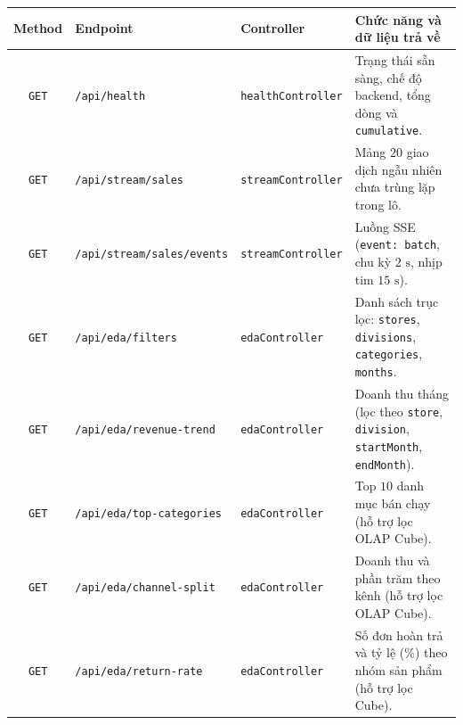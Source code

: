 \begin{table}[H]
	\centering
	\footnotesize
	\setlength{\tabcolsep}{3.5pt}
	\begin{tabular}{c l l p{5.5cm}}
		\toprule
		\textbf{Method} & \textbf{Endpoint}                        & \textbf{Controller}          & \textbf{Chức năng và dữ liệu trả về}                                                                \\
		\midrule
		\texttt{GET}    & \texttt{/api/health}                     & \texttt{healthController}    & Trạng thái sẵn sàng, chế độ backend, tổng dòng và \texttt{cumulative}.                              \\
		\texttt{GET}    & \texttt{/api/stream/sales}               & \texttt{streamController}    & Mảng $20$ giao dịch ngẫu nhiên chưa trùng lặp trong lô.                                             \\
		\texttt{GET}    & \texttt{/api/stream/sales/events}        & \texttt{streamController}    & Luồng SSE (\texttt{event: batch}, chu kỳ $2\text{ s}$, nhịp tim $15\text{ s}$).                     \\
		\texttt{GET}    & \texttt{/api/eda/filters}                & \texttt{edaController}       & Danh sách trục lọc: \texttt{stores}, \texttt{divisions}, \texttt{categories}, \texttt{months}.      \\
		\texttt{GET}    & \texttt{/api/eda/revenue-trend}          & \texttt{edaController}       & Doanh thu tháng (lọc theo \texttt{store}, \texttt{division}, \texttt{startMonth}, \texttt{endMonth}). \\
		\texttt{GET}    & \texttt{/api/eda/top-categories}         & \texttt{edaController}       & Top $10$ danh mục bán chạy (hỗ trợ lọc OLAP Cube).                                                  \\
		\texttt{GET}    & \texttt{/api/eda/channel-split}          & \texttt{edaController}       & Doanh thu và phần trăm theo kênh (hỗ trợ lọc OLAP Cube).                                            \\
		\texttt{GET}    & \texttt{/api/eda/return-rate}            & \texttt{edaController}       & Số đơn hoàn trả và tỷ lệ (\%) theo nhóm sản phẩm (hỗ trợ lọc Cube).                                 \\

\end{tabular}
\end{table}
